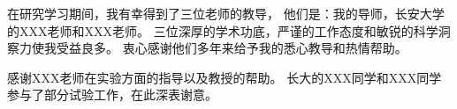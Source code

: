 
\begin{acknowledgements}

在研究学习期间，我有幸得到了三位老师的教导，
他们是：我的导师，长安大学的XXX老师和XXX老师。
三位深厚的学术功底，严谨的工作态度和敏锐的科学洞察力使我受益良多。
衷心感谢他们多年来给予我的悉心教导和热情帮助。

感谢XXX老师在实验方面的指导以及教授的帮助。
长大的XXX同学和XXX同学参与了部分试验工作，在此深表谢意。

\end{acknowledgements}
